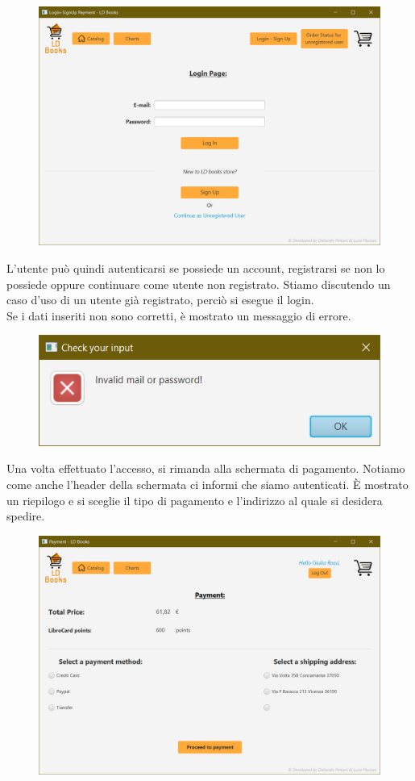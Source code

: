 \documentclass[a4paper,11pt]{report}
\begin{document}
\begin{figure}[h!]
	\centering
	\includegraphics[width=0.8\linewidth]{Screenshots/login.png}
\end{figure}

L'utente può quindi autenticarsi se possiede un account, registrarsi se non lo possiede oppure continuare come utente non registrato. Stiamo discutendo un caso d'uso di un utente già registrato, perciò si esegue il login.\\
Se i dati inseriti non sono corretti, è mostrato un messaggio di errore.

\begin{figure}[h!]
	\centering
	\includegraphics[width=0.5\linewidth]{Screenshots/loginErrato.png}
\end{figure}
\newpage

Una volta effettuato l'accesso, si rimanda alla schermata di pagamento. Notiamo come anche l'header della schermata ci informi che siamo autenticati. È mostrato un riepilogo e si sceglie il tipo di pagamento e l'indirizzo al quale si desidera spedire.

\begin{figure}[h!]
	\centering
	\includegraphics[width=0.8\linewidth]{Screenshots/payment.png}
\end{figure}
\end{document}
